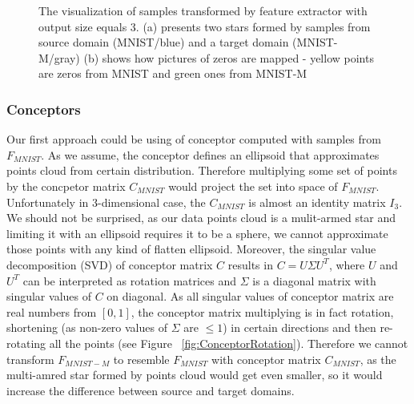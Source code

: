 \documentclass{article}
\begin{document}
\begin{figure}[htb]%
    \centering
    \qquad
    \caption{The visualization of samples transformed by feature extractor with output size equals 3. (a) presents two stars formed by samples from source domain (MNIST/blue) and a target domain (MNIST-M/gray) (b) shows how pictures of zeros are mapped - yellow points are zeros from MNIST and green ones from MNIST-M}%
    \label{fig:MNIST_3D}%
\end{figure}

\subsubsection{Conceptors}
\par
Our first approach could be using of conceptor computed with samples from $F_{MNIST}$. As we assume, the conceptor defines an ellipsoid that approximates points cloud from certain distribution. Therefore multiplying some set of points by the concpetor matrix $C_{MNIST}$ would project the set into space of $F_{MNIST}$. Unfortunately in 3-dimensional case, the $C_{MNIST}$ is almost an identity matrix $I_{3}$. We should not be surprised, as our data points cloud is a mulit-armed star and limiting it with an ellipsoid requires it to be a sphere, we cannot approximate those points with any kind of flatten ellipsoid. Moreover, the singular value decomposition (SVD) of conceptor matrix $C$ results in $C = U\Sigma U^{T}$, where $U$ and $U^{T}$ can be interpreted as rotation matrices and $\Sigma$ is a diagonal matrix with singular values of $C$ on diagonal. As all singular values of conceptor matrix are real numbers from $[0,1]$, the conceptor matrix multiplying is in fact rotation, shortening (as non-zero values of $\Sigma$ are $\leq 1$) in certain directions and then re-rotating all the points (see Figure ~\ref{fig:ConceptorRotation}). Therefore we cannot transform $F_{MNIST-M}$ to resemble $F_{MNIST}$ with conceptor matrix $C_{MNIST}$, as the multi-amred star formed by points cloud would get even smaller, so it would increase the difference between source and target domains.
\end{document}
